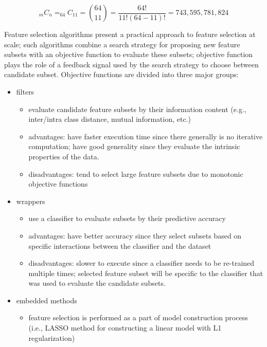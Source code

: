 \begin{equation}
    _{m}C_n = _{64}C_{11} = \binom{64} {11} = \frac{64!} {11!(64 - 11)!} = 743,595,781,824
\end{equation}

Feature selection algorithms present a practical approach to feature selection at scale;
such algorithms combine a search strategy for proposing new feature subsets with an objective function to evaluate these subsets;
objective function plays the role of a feedback signal used by the search strategy to choose between candidate subset.
Objective functions are divided into three major groups:

\begin{itemize}
    \item filters
    \begin{itemize}
        \item evaluate candidate feature subsets by their information content (e.g., inter/intra class distance, mutual information, etc.)
        \item advantages: have faster execution time since there generally is no iterative computation;
        have good generality since they evaluate the intrinsic properties of the data.
        \item disadvantages: tend to select large feature subsets due to monotonic objective functions
    \end{itemize}
    \item wrappers
    \begin{itemize}
        \item use a classifier to evaluate subsets by their predictive accuracy
        \item advantages: have better accuracy since they select subsets based on specific interactions between the classifier and the dataset
        \item disadvantages: slower to execute since a classifier needs to be re-trained multiple times;
        selected feature subset will be specific to the classifier that was used to evaluate the candidate subsets.
    \end{itemize}
    \item embedded methods
    \begin{itemize}
        \item feature selection is performed as a part of model construction process (i.e., LASSO method for constructing a linear model with L1 regularization)\cite{Scikit-learndevelopers2019}
    \end{itemize}
\end{itemize}

